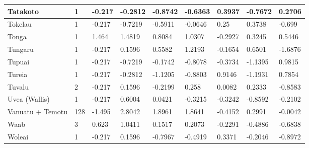 \documentclass[draft,10pt]{article} %
\begin{document}
\begin{landscape}
\begin{longtable}{| p{2.6cm} |  p{1cm} | p{1.2cm}  | p{1.9cm}  | p{1.7cm}  | p{1.7cm}  | p{1.7cm}  | p{1.6cm} | p{1.5cm}   |}
Tatakoto&1&-0.217&-0.2812&-0.8742&-0.6363&0.3937&-0.7672&0.2706\\ \hline
Tokelau&1&-0.217&-0.7219&-0.5911&-0.0646&0.25&0.3738&-0.699\\ \hline
Tonga&1&1.464&1.4819&0.8084&1.0307&-0.2927&0.3245&0.5446\\ \hline
Tungaru&1&-0.217&0.1596&0.5582&1.2193&-0.1654&0.6501&-1.6876\\ \hline
Tupuai&1&-0.217&-0.7219&-0.1742&-0.8078&-0.3734&-1.1395&0.9815\\ \hline
Tureia&1&-0.217&-0.2812&-1.1205&-0.8803&0.9146&-1.1931&0.7854\\ \hline
Tuvalu&2&-0.217&0.1596&-0.2199&0.258&0.0082&0.2333&-0.8583\\ \hline
Uvea (Wallis)&1&-0.217&0.6004&0.0421&-0.3215&-0.3242&-0.8592&-0.2102\\ \hline
Vanuatu + Temotu&128&-1.495&2.8042&1.8961&1.8641&-0.4152&0.2991&-0.0042\\ \hline
Waab&3&0.623&1.0411&0.1517&0.2073&-0.2291&-0.4886&-0.6838\\ \hline
Woleai&1&-0.217&0.1596&-0.7967&-0.4919&0.3371&-0.2046&-0.8972\\ \hline

 \end{longtable}
\end{landscape}
\newpage
\end{document}
